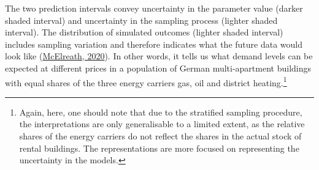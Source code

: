\documentclass[12pt,twoside]{reedthesis}
\begin{document}
The two prediction intervals convey uncertainty in the parameter value (darker shaded interval) and uncertainty in the sampling process (lighter shaded interval). The distribution of simulated outcomes (lighter shaded interval) includes sampling variation and therefore indicates what the future data would look like (\protect\hyperlink{ref-mcelreath20}{McElreath, 2020}). In other words, it tells us what demand levels can be expected at different prices in a population of German multi-apartment buildings with equal shares of the three energy carriers gas, oil and district heating.\footnote{Again, here, one should note that due to the stratified sampling procedure, the interpretations are only generalisable to a limited extent, as the relative shares of the energy carriers do not reflect the shares in the actual stock of rental buildings. The representations are more focused on representing the uncertainty in the models.}
\end{document}
